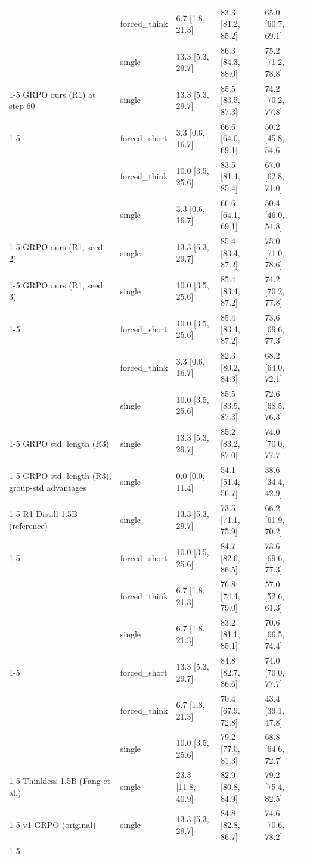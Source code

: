 \begin{table}
\begin{tabular}{lllll}
 & forced_think & 6.7 [1.8, 21.3] & 83.3 [81.2, 85.2] & 65.0 [60.7, 69.1] \\
 & single & 13.3 [5.3, 29.7] & 86.3 [84.3, 88.0] & 75.2 [71.2, 78.8] \\
\cline{1-5}
GRPO ours (R1) at step 60 & single & 13.3 [5.3, 29.7] & 85.5 [83.5, 87.3] & 74.2 [70.2, 77.8] \\
\cline{1-5}
\multirow[t]{3}{*}{GRPO ours (R1), group-std advantages} & forced_short & 3.3 [0.6, 16.7] & 66.6 [64.0, 69.1] & 50.2 [45.8, 54.6] \\
 & forced_think & 10.0 [3.5, 25.6] & 83.5 [81.4, 85.4] & 67.0 [62.8, 71.0] \\
 & single & 3.3 [0.6, 16.7] & 66.6 [64.1, 69.1] & 50.4 [46.0, 54.8] \\
\cline{1-5}
GRPO ours (R1, seed 2) & single & 13.3 [5.3, 29.7] & 85.4 [83.4, 87.2] & 75.0 [71.0, 78.6] \\
\cline{1-5}
GRPO ours (R1, seed 3) & single & 10.0 [3.5, 25.6] & 85.4 [83.4, 87.2] & 74.2 [70.2, 77.8] \\
\cline{1-5}
\multirow[t]{3}{*}{GRPO ours, balanced exploration (R1b)} & forced_short & 10.0 [3.5, 25.6] & 85.4 [83.4, 87.2] & 73.6 [69.6, 77.3] \\
 & forced_think & 3.3 [0.6, 16.7] & 82.3 [80.2, 84.3] & 68.2 [64.0, 72.1] \\
 & single & 10.0 [3.5, 25.6] & 85.5 [83.5, 87.3] & 72.6 [68.5, 76.3] \\
\cline{1-5}
GRPO std. length (R3) & single & 13.3 [5.3, 29.7] & 85.2 [83.2, 87.0] & 74.0 [70.0, 77.7] \\
\cline{1-5}
GRPO std. length (R3), group-std advantages & single & 0.0 [0.0, 11.4] & 54.1 [51.4, 56.7] & 38.6 [34.4, 42.9] \\
\cline{1-5}
R1-Distill-1.5B (reference) & single & 13.3 [5.3, 29.7] & 73.5 [71.1, 75.9] & 66.2 [61.9, 70.2] \\
\cline{1-5}
\multirow[t]{3}{*}{SFT (v2)} & forced_short & 10.0 [3.5, 25.6] & 84.7 [82.6, 86.5] & 73.6 [69.6, 77.3] \\
 & forced_think & 6.7 [1.8, 21.3] & 76.8 [74.4, 79.0] & 57.0 [52.6, 61.3] \\
 & single & 6.7 [1.8, 21.3] & 83.2 [81.1, 85.1] & 70.6 [66.5, 74.4] \\
\cline{1-5}
\multirow[t]{3}{*}{SFT, long think traces (ablation)} & forced_short & 13.3 [5.3, 29.7] & 84.8 [82.7, 86.6] & 74.0 [70.0, 77.7] \\
 & forced_think & 6.7 [1.8, 21.3] & 70.4 [67.9, 72.8] & 43.4 [39.1, 47.8] \\
 & single & 10.0 [3.5, 25.6] & 79.2 [77.0, 81.3] & 68.8 [64.6, 72.7] \\
\cline{1-5}
Thinkless-1.5B (Fang et al.) & single & 23.3 [11.8, 40.9] & 82.9 [80.8, 84.9] & 79.2 [75.4, 82.5] \\
\cline{1-5}
v1 GRPO (original) & single & 13.3 [5.3, 29.7] & 84.8 [82.8, 86.7] & 74.6 [70.6, 78.2] \\
\cline{1-5}
\bottomrule
\end{tabular}
\end{table}
